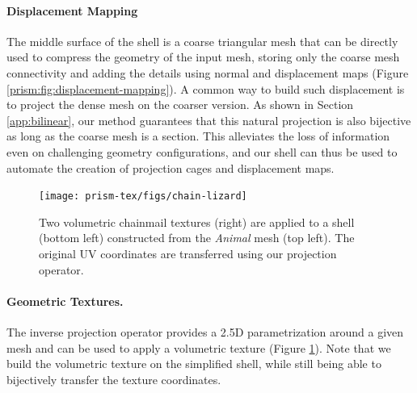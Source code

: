 \paragraph{Displacement Mapping}
The middle surface of the shell is a coarse triangular mesh that can be directly used to compress the geometry of the input mesh, storing only the coarse mesh connectivity and adding the details using normal and displacement maps (Figure \ref{prism:fig:displacement-mapping}). A common way to build such displacement is to project {\cite{kobbelt1998interactive,collins2002mesh}} the dense mesh on the coarser version. As shown in Section \ref{app:bilinear}, our method guarantees that this natural projection is also bijective as long as the coarse mesh is a section. This 
{alleviates the loss of information}
even on challenging geometry configurations, and our shell can thus be used to automate the creation of projection cages and displacement maps.



\begin{figure}
    \centering
    \texttt{[image: prism-tex/figs/chain-lizard]}
    \caption{Two volumetric chainmail textures (right) are applied to a shell (bottom left) constructed from the \emph{Animal} mesh (top left).
    The original UV coordinates are transferred using our projection operator.}
    \label{prism:fig:volumetric-textures}
    
\end{figure}
\paragraph{Geometric Textures.}
The inverse projection operator provides a 2.5D parametrization around a given mesh and can be used to apply a volumetric texture (Figure \ref{prism:fig:volumetric-textures}).
Note that we build the volumetric texture on the simplified shell, while still being able to bijectively transfer the texture coordinates.



